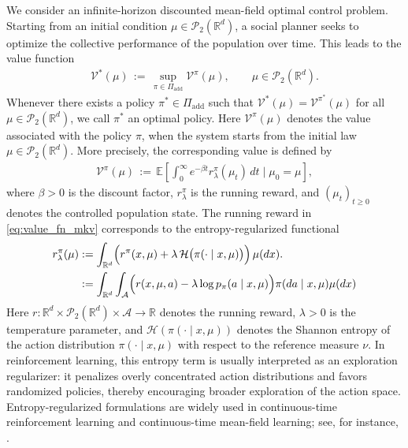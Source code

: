 \documentclass[a4paper, 10pt, english, reqno]{amsart}
\def\R{\mathbb R}
\begin{document}
We consider an infinite-horizon discounted mean-field optimal control
problem. Starting from an initial condition
$\mu\in\mathcal P_2(\mathbb R^d)$, a social planner seeks to optimize
the collective performance of the population over time. This leads to
the value function
\begin{align}\label{eq:optimal_CP_mkv}
  \mathcal V^*(\mu)
  \,:=\,
  \sup_{\pi\in\Pi_{\mathrm{add}}}\mathcal V^\pi(\mu),
  \qquad
  \mu\in\mathcal P_2(\mathbb R^d).
\end{align}
Whenever there exists a policy $\pi^*\in\Pi_{\mathrm{add}}$ such that
$\mathcal V^*(\mu)=\mathcal V^{\pi^*}(\mu)$ for all
$\mu\in\mathcal P_2(\mathbb R^d)$, we call $\pi^*$ an optimal policy. Here $\mathcal V^\pi(\mu)$ denotes the value associated with the policy
$\pi$, when the system starts from the
initial law $\mu\in\mathcal P_2(\mathbb R^d)$. More precisely, the
corresponding value is defined by
\begin{align}\label{eq:value_fn_mkv}
  \mathcal V^\pi(\mu)
  \,:=\,
  \mathbb E\!\left[
    \int_0^\infty e^{-\beta t}
    r_\lambda^\pi(\mu_t)\,dt
    \;\bigg|\;
    \mu_0=\mu
  \right],
\end{align}
where $\beta>0$ is the discount factor, $r_\lambda^\pi$ is the running
reward, and $(\mu_t)_{t\ge0}$ denotes the controlled population state. The running reward in \eqref{eq:value_fn_mkv} corresponds to the
entropy-regularized functional
\begin{equation}\label{eq:reg_reward_avg_mkv}
  \begin{aligned}
    r_\lambda^\pi(\mu)&:=
\int_{\mathbb R^d}
\Bigl(r^\pi(x,\mu)+\lambda\,\mathcal H\bigl(\pi(\cdot\mid x,\mu)\bigr)\Bigr)\,\mu(dx).\\
    &:= \int_{\R^d}\int_{\mathcal A} \Bigl(r(x,\mu,a)
    -\lambda
    \log p_\pi(a\mid x,\mu)\Bigr)\pi(da\mid x,\mu)\mu(dx)
  \end{aligned}
\end{equation}
Here $r:\mathbb R^d\times\mathcal P_2(\mathbb R^d)\times\mathcal A\to\mathbb R$ denotes the running reward, $\lambda>0$ is the temperature parameter, and $\mathcal H(\pi(\cdot\mid x,\mu))$ denotes the Shannon entropy of the action distribution $\pi(\cdot\mid x,\mu)$ with respect to the reference measure $\nu$. In reinforcement learning, this entropy term is usually interpreted as an exploration regularizer: it penalizes overly concentrated action distributions and favors randomized policies, thereby encouraging broader exploration of the action space. Entropy-regularized formulations are widely used in continuous-time reinforcement learning and continuous-time mean-field learning; see, for instance, \cite{wang2020,jia2022,jia2023,jia_qlearning2023,Wei2023ContinuousTQ,frikhaActorCritic}.
\end{document}
